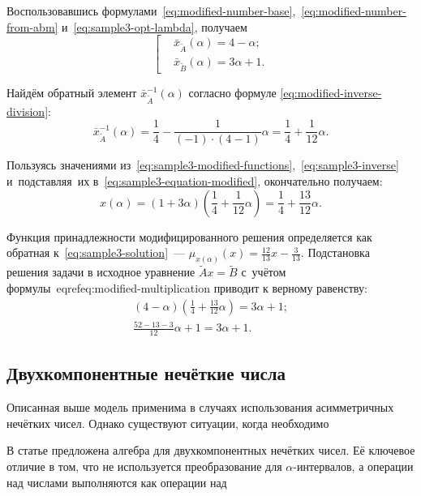 Воспользовавшись формулами~\eqref{eq:modified-number-base},~\eqref{eq:modified-number-from-abm} и~\eqref{eq:sample3-opt-lambda}, получаем
\begin{equation}
\label{eq:sample3-modified-functions}
  \left[ \begin{aligned}
    & \bar{x}_{\tilde A}\left( \alpha  \right)=4-\alpha;  \\ 
    & \bar{x}_{\tilde B}\left( \alpha  \right)=3\alpha+1.
  \end{aligned} \right.
\end{equation}

Найдём обратный элемент $\bar{x}_{\tilde A}^{-1}\left( \alpha  \right)$ согласно формуле \eqref{eq:modified-inverse-division}: 
\begin{equation}
\label{eq:sample3-inverse}
  \bar{x}_{\tilde A}^{-1}\left( \alpha  \right)=\frac{1}{4}-\frac{1}{\left( -1 \right)\cdot \left( 4-1 \right)}\alpha =\frac{1}{4}+\frac{1}{12}\alpha.\end{equation}

Пользуясь значениями из~\eqref{eq:sample3-modified-functions},~\eqref{eq:sample3-inverse} и~подставляя~их в~\eqref{eq:sample3-equation-modified}, окончательно получаем:
\begin{equation}
\label{eq:sample3-solution}
  x\left( \alpha  \right)=\left( 1+3\alpha  \right)\left( \frac{1}{4}+\frac{1}{12}\alpha  \right)=\frac{1}{4}+\frac{13}{12}\alpha.
\end{equation}

Функция принадлежности модифицированного решения определяется как обратная к~\eqref{eq:sample3-solution}~--- $\displaystyle \mu_{x\left(\alpha \right)}\left(x \right)=\frac{12}{13}x-\frac{3}{13}$. Подстановка решения задачи в исходное уравнение $\tilde{A}x=\tilde{B}$ с~учётом формулы~eqref{eq:modified-multiplication} приводит к верному равенству:
\begin{gather*}
  \left( 4-\alpha  \right)\left( \frac{1}{4}+\frac{13}{12}\alpha  \right)=3\alpha +1; \\
  \frac{52-13-3}{12}\alpha +1=3\alpha +1.  
\end{gather*}

\subsection{Двухкомпонентные нечёткие числа}

Описанная выше модель применима в случаях использования асимметричных нечётких чисел. Однако существуют ситуации, когда  необходимо 

В статье \cite{Kanischeva} предложена алгебра для двухкомпонентных нечётких чисел. Её ключевое отличие в том, что не используется преобразование для $\alpha$-интервалов, а операции над числами выполняются как операции над